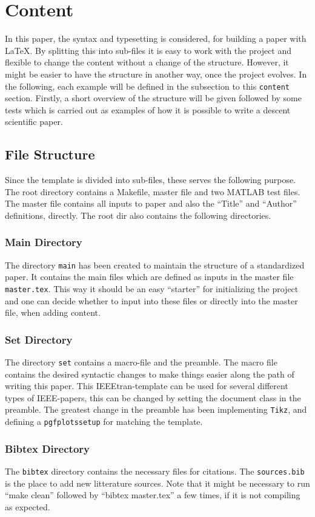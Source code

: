 \section{Content}
In this paper, the syntax and typesetting is considered, for building a paper with \LaTeX. By splitting this into sub-files it is easy to work with the project and flexible to change the content without a change of the structure. However, it might be easier to have the structure in another way, once the project evolves. In the following, each example will be defined in the subsection to this \texttt{content} section. Firstly, a short overview of the structure will be given followed by some tests which is carried out as examples of how it is possible to write a descent scientific paper.
%
\subsection{File Structure}
Since the template is divided into sub-files, these serves the following purpose. The root directory contains a Makefile, master file and two MATLAB test files. The master file contains all inputs to paper and also the ``Title'' and ``Author'' definitions, directly. The root dir also contains the following directories.
%

\subsubsection{Main Directory}
\label{sec:maindir}
The directory \texttt{main} has been created to maintain the structure of a standardized paper. It contains the main files which are defined as inputs in the master file \texttt{master.tex}. This way it should be an easy ``starter'' for initializing the project and one can decide whether to input into these files or directly into the master file, when adding content.
%
\subsubsection{Set Directory}
\label{sec:setdir}
The directory \texttt{set} contains a macro-file and the preamble. The macro file contains the desired syntactic changes to make things easier along the path of writing this paper. This IEEEtran-template\cite{IEEEhowto:IEEEtranpage} can be used for several different types of IEEE-papers, this can be changed by setting the document class in the preamble. The greatest change in the preamble has been implementing \texttt{Tikz}, and defining a \texttt{pgfplotssetup} for matching the template.
%
\subsubsection{Bibtex Directory}
\label{sec:bibtexdir}
The \texttt{bibtex} directory contains the necessary files for citations. The \texttt{sources.bib} is the place to add new litterature sources. Note that it might be necessary to run ``make clean'' followed by ``bibtex master.tex'' a few times, if it is not compiling as expected.
%
